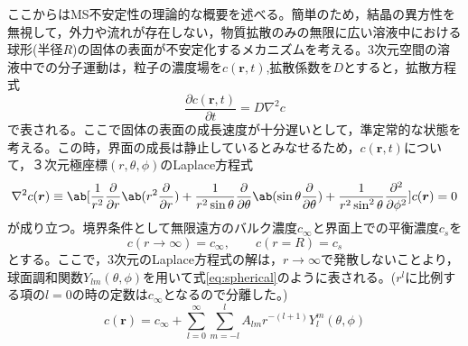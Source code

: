 \documentclass[autodetect-engine,dvi=dvipdfmx,a4paper,ja=standard,oneside,openany]{bxjsbook}
\begin{document}
ここからはMS不安定性の理論的な概要を述べる。簡単のため，結晶の異方性を無視して，外力や流れが存在しない，物質拡散のみの無限に広い溶液中における球形(半径$R$)の固体の表面が不安定化するメカニズムを考える\cite{フラクタル科学}\cite{mullins1963morphological}。3次元空間の溶液中での分子運動は，粒子の濃度場を$c(\bm{r},t)$,拡散係数を$D$とすると，拡散方程式
\begin{equation}
  \frac{\partial c(\bm{r},t)}{\partial t} = D\nabla^2c
  \label{eq:diffusion}
\end{equation}
で表される。ここで固体の表面の成長速度が十分遅いとして，準定常的な状態を考える。この時，界面の成長は静止しているとみなせるため，$c(\bm{r},t)$について，３次元極座標$(r,\theta,\phi)$のLaplace方程式
\begin{equation}
  \nabla^2c(\bm{r})\equiv \ab[\frac{1}{r^2}\pdv*{\ab(r^2\pdv{}{r})}{r}+\frac{1}{r^2\sin\theta}\pdv*{\ab(\sin\theta\pdv{}{\theta})}{\theta}+\frac{1}{r^2\sin^2\theta}\pdv[2]{}{\phi}]c(\bm{r})=0
  \label{eq:laplace}
\end{equation}
が成り立つ。境界条件として無限遠方のバルク濃度$c_{\infty}$と界面上での平衡濃度$c_s$を
\begin{equation}
  c(r\rightarrow \infty)  = c_{\infty}, \qquad c(r=R)= c_s
  \label{eq:boundary_MS}
\end{equation}
とする。ここで，3次元のLaplace方程式の解は，$r\to\infty$で発散しないことより，球面調和関数$Y_{lm}(\theta,\phi)$を用いて式\eqref{eq:spherical}のように表される。($r^l$に比例する項の$l=0$の時の定数は$c_\infty$となるので分離した。)
\begin{equation}
  c(\bm{r}) = c_{\infty} + \sum_{l=0}^{\infty}\sum_{m=-l}^{l}A_{lm}r^{-(l+1)}Y_{l}^{m}(\theta,\phi)
  \label{eq:spherical}
\end{equation}
\end{document}
